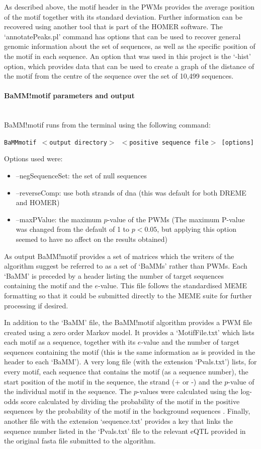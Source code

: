 \documentclass[12pt]{article}
\begin{document}
As described above, the motif header in the PWMs provides the average position of the motif together with its standard deviation. Further information can be recovered using another tool that is part of the HOMER software. The `annotatePeaks.pl' command has options that can be used to recover general genomic information about the set of sequences, as well as the specific position of the motif in each sequence. An option that was used in this project is the `-hist' option, which provides data that can be used to create a graph of the distance of the motif from the centre of the sequence over the set of 10,499 sequences.

\paragraph{BaMM!motif parameters and output}\mbox{}\\
BaMM!motif runs from the terminal using the following command:

\texttt{BaMMmotif $<$output directory$>$ $<$positive sequence file$>$ [options]}

Options used were:
\begin{itemize}
\item --negSequenceSet: the set of null sequences
\item --reverseComp: use both strands of dna (this was default for both DREME and HOMER)
\item --maxPValue: the maximum $p$-value of the PWMs (The maximum P-value was changed from the default of 1 to $p<0.05$, but applying this option seemed to have no affect on the results obtained)
\end{itemize}

As output BaMM!motif provides a set of matrices which the writers of the algorithm suggest be referred to as a set of `BaMMs' rather than PWMs. Each `BaMM' is preceded by a header listing the number of target sequences containing the motif and the $e$-value. This file follows the standardised MEME formatting so that it could be submitted directly to the MEME suite for further processing if desired.

In addition to the `BaMM' file, the BaMM!motif algorithm provides a PWM file created using a zero order Markov model. It provides a `MotifFile.txt' which lists each motif as a sequence, together with its $e$-value and the number of target sequences containing the motif (this is the same information as is provided in the header to each `BaMM'). A very long file (with the extension `Pvals.txt') lists, for every motif, each sequence that contains the motif (as a sequence number), the start position of the motif in the sequence, the strand (+ or -) and the $p$-value of the individual motif in the sequence. The $p$-values were calculated using the log-odds score calculated by dividing the probability of the motif in the positive sequences by the probability of the motif in the background sequences \citep{siebert2016bayesian}. Finally, another file with the extension `sequence.txt' provides a key that links the sequence number listed in the `Pvals.txt' file to the relevant eQTL provided in the original fasta file submitted to the algorithm. 
\end{document}
